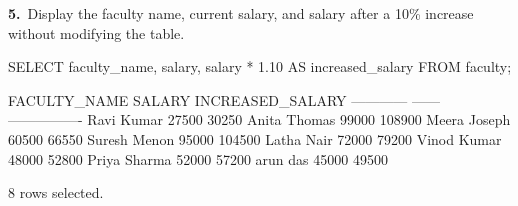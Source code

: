 \noindent\begin{minipage}{\linewidth}
\begingroup{}
{\fontsize{14}{17}\selectfont\textbf{5.}}\ Display the faculty name, current salary, and salary after a 10\% increase without modifying the table.\par
\endgroup\vspace{12pt}


\begin{sqlcode}
SELECT faculty_name, salary, salary * 1.10 AS increased_salary
FROM faculty;
\end{sqlcode}

\vspace{18pt}


\begin{sqlout}[fontsize=\small]
FACULTY_NAME  SALARY  INCREASED_SALARY
------------  ------  ----------------
Ravi Kumar     27500             30250
Anita Thomas   99000            108900
Meera Joseph   60500             66550
Suresh Menon   95000            104500
Latha Nair     72000             79200
Vinod Kumar    48000             52800
Priya Sharma   52000             57200
arun das       45000             49500

8 rows selected.
\end{sqlout}
\end{minipage}\par\vspace{24pt}

